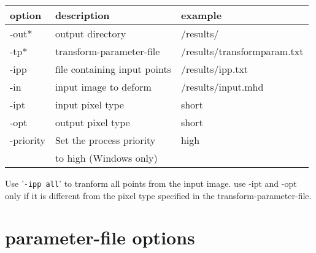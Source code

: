 \documentclass[a4paper]{article}
\newenvironment{Tabular}[1]{\ttfamily \begin{tabular}{#1}}{\end{tabular}}
\begin{document}
\begin{Tabular}{lll}
\rmfamily option & \rmfamily description & \rmfamily example \\
\hline
-out*    &  output directory    &   /results/ \\
-tp*     &  transform-parameter-file      &   /results/transformparam.txt \\
-ipp     &  file containing input points   &   /results/ipp.txt \\
-in      &  input image to deform       &   /results/input.mhd \\
-ipt    &   input pixel type    &   short \\
-opt    &   output pixel type   &   short \\
-priority & Set the process priority & high \\
            & to high (Windows only) &
\end{Tabular}

Use '\texttt{-ipp all}' to tranform all points from the input image. use -ipt and -opt only if it
is different from the pixel type specified in the transform-parameter-file.

\section{parameter-file options}
\end{document}
